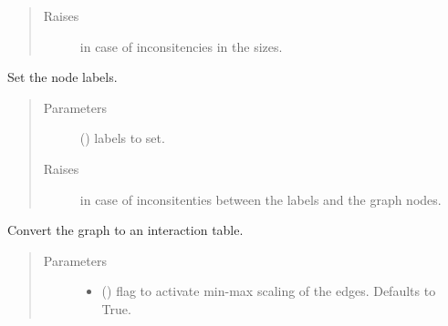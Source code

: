 \documentclass[letterpaper,10pt,english]{sphinxmanual}
\begin{document}
\begin{fulllineitems}
\begin{fulllineitems}
\begin{quote}
\begin{description}
\item[{Raises}] \leavevmode
{} \textendash{} in case of inconsitencies in the sizes.

\end{description}\end{quote}

\end{fulllineitems}


\begin{fulllineitems}
\label{\detokenize{_modules/cosifer.collections:cosifer.collections.graph.Graph.set_labels}}
Set the node labels.
\begin{quote}\begin{description}
\item[{Parameters}] \leavevmode
{} () \textendash{} labels to set.

\item[{Raises}] \leavevmode
{} \textendash{} in case of inconsitenties between
    the labels and the graph nodes.

\end{description}\end{quote}

\end{fulllineitems}


\begin{fulllineitems}
\label{\detokenize{_modules/cosifer.collections:cosifer.collections.graph.Graph.to_interaction_table}}
Convert the graph to an interaction table.
\begin{quote}\begin{description}
\item[{Parameters}] \leavevmode\begin{itemize}
\item {} 
 (\sphinxstyleliteralemphasis{\sphinxupquote{, }}) \textendash{} flag to activate min-max scaling of the
edges. Defaults to True.


\end{itemize}
\end{description}
\end{quote}
\end{fulllineitems}
\end{fulllineitems}
\end{document}
